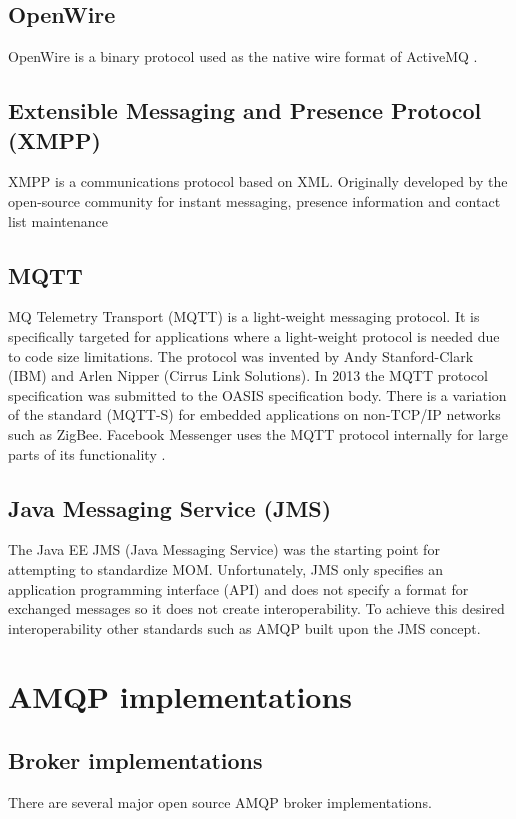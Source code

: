 \documentclass{thesis}
\begin{document}
\subsection{OpenWire}
OpenWire is a binary protocol used as the native wire format of ActiveMQ \cite{OPENWIRE}.

\subsection{Extensible Messaging and Presence Protocol (XMPP)}
XMPP is a communications protocol based on XML.  Originally developed by the open-source community for instant messaging, presence information and contact list maintenance \cite{XMPP}  

\subsection{MQTT}
MQ Telemetry Transport (MQTT) is a light-weight messaging protocol.  It is specifically targeted for applications where a light-weight protocol is needed due to code size limitations.  The protocol was invented by Andy Stanford-Clark (IBM) and Arlen Nipper (Cirrus Link Solutions).  In 2013 the MQTT protocol specification was submitted to the OASIS specification body.  There is a variation of the standard (MQTT-S) for embedded applications on non-TCP/IP networks such as ZigBee.  Facebook Messenger uses the MQTT protocol internally for large parts of its functionality \cite{MQTT}. 

\subsection{Java Messaging Service (JMS)}
The Java EE JMS (Java Messaging Service) was the starting point for attempting to standardize MOM. Unfortunately, JMS only specifies an application programming interface (API) and does not specify a format for exchanged messages so it does not create interoperability.   To achieve this desired interoperability other standards such as AMQP built upon the JMS concept.  

\section{AMQP implementations}

\subsection{Broker implementations}
There are several major open source AMQP broker implementations.  
\end{document}
